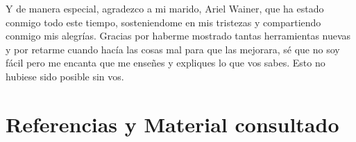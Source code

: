 \documentclass[a4paper]{article}
\begin{document}
Y de manera especial, agradezco a mi marido, Ariel Wainer, que ha estado conmigo todo este tiempo, sosteniendome en mis tristezas y compartiendo conmigo mis alegrías. Gracias por haberme mostrado tantas herramientas nuevas y por retarme cuando hacía las cosas mal para que las mejorara, sé que no soy fácil pero me encanta que me enseñes y expliques lo que vos sabes. Esto no hubiese sido posible sin vos.


\newpage
\section{Referencias y Material consultado}

\renewcommand\refname{\small}

\begin{thebibliography}{X}
















\end{thebibliography}
\end{document}

